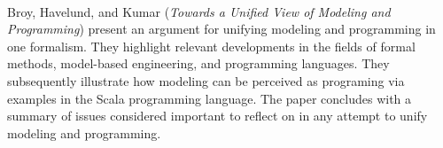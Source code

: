 

\ \hline \ %

Broy, Havelund, and Kumar
\cite{isola-2016-broy}
({\em Towards a Unified View of Modeling and Programming})
present an argument for unifying modeling and programming in one 
formalism. They highlight relevant developments in the fields 
of formal methods, model-based engineering, and programming 
languages. They subsequently illustrate how modeling can be 
perceived as programing via examples in the Scala 
programming language. The paper concludes with a summary of
issues considered important to reflect on in any attempt to 
unify modeling and programming.

\done{}